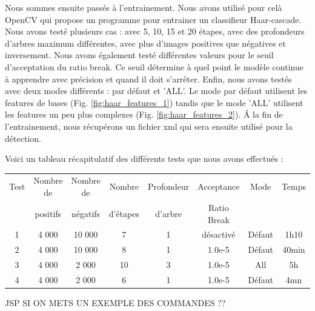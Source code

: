 \documentclass[11pt]{article}
\begin{document}
Nous sommes ensuite passés à l'entrainement. Nous avons utilisé pour celà OpenCV qui propose un programme pour entrainer un classifieur Haar-cascade. Nous avons testé plusieurs cas : avec 5, 10, 15 et 20 étapes, avec des profondeurs d'arbres maximum différentes, avec plus d'images positives que négatives et inversement. Nous avons également testé différentes valeurs pour le seuil d'acceptation du ratio break. Ce seuil détermine à quel point le modèle continue à apprendre avec précision et quand il doit s'arrêter. Enfin, nous avons testés avec deux modes différents : par défaut et 'ALL'. Le mode par défaut utilisent les features de bases (Fig. \ref{fig:haar_features_1}) tandis que le mode 'ALL' utilisent les features un peu plus complexes (Fig. \ref{fig:haar_features_2}). \'A la fin de l'entrainement, nous récupérons un fichier xml qui sera ensuite utilisé pour la détection.\bigbreak

\bigbreak

\noindent Voici un tableau récapitulatif des différents tests que nous avons effectués : \bigbreak

\begin{center} 
    \begin{tabular}{|c|c|c|c|c|c|c|c|}
        \hline
        Test & Nombre de & Nombre de & Nombre & Profondeur & Acceptance  & Mode & Temps \\
        & positifs & négatifs & d'étapes & d'arbre & Ratio Break &  &  \\ 
        \hline 
        1 & 4 000 & 10 000 & 7 & 1 & désactivé & Défaut & 1h10 \\ 
        \hline
        2 & 4 000 & 10 000 & 8 & 1 & 1.0e-5 & Défaut & 40min \\
        \hline
        3 & 4 000 & 2 000 & 10 & 3 & 1.0e-5 & All & 5h \\
        \hline
        4 & 4 000 & 2 000 & 6 & 1 & 1.0e-5 & Défaut & 4mn \\
        \hline
    \end{tabular}
\end{center}

\bigbreak
{\LARGE JSP SI ON METS UN EXEMPLE DES COMMANDES ??}
\end{document}
